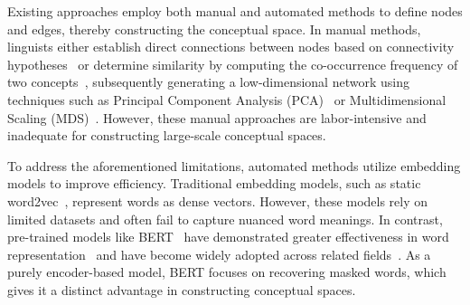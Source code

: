 Existing approaches employ both manual and automated methods to define nodes and edges, thereby constructing the conceptual space. In manual methods, linguists either establish direct connections between nodes based on connectivity hypotheses~\cite{croft2001radical} or determine similarity by computing the co-occurrence frequency of two concepts~\cite{cysouw2007building}, subsequently generating a low-dimensional network using techniques such as Principal Component Analysis (PCA)~\cite{abdi2010principal} or Multidimensional Scaling (MDS)~\cite{goldstone1994efficient}. However, these manual approaches are labor-intensive and inadequate for constructing large-scale conceptual spaces.


To address the aforementioned limitations, automated methods utilize embedding models to improve efficiency. Traditional embedding models, such as static word2vec~\cite{church2017word2vec}, represent words as dense vectors. However, these models rely on limited datasets and often fail to capture nuanced word meanings. In contrast, pre-trained models like BERT~\cite{devlin2019bert} have demonstrated greater effectiveness in word representation~\cite{devlin2019bert,tenney2019bert} and have become widely adopted across related fields~\cite{moullec2025cheaper}. As a purely encoder-based model, BERT focuses on recovering masked words, which gives it a distinct advantage in constructing conceptual spaces.


